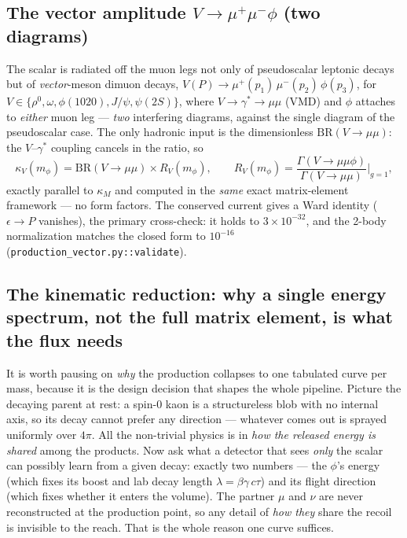 \documentclass[11pt]{article}
\newcommand{\mphi}{m_\phi}
\begin{document}
\subsection{The vector amplitude $V\to\mu^+\mu^-\phi$ (two diagrams)}
\label{sec:vector}

The scalar is radiated off the muon legs not only of pseudoscalar leptonic decays
but of \emph{vector}-meson dimuon decays,
$V(P)\to\mu^+(p_1)\,\mu^-(p_2)\,\phi(p_3)$, for $V\in\{\rho^0,\omega,\phi(1020),
J/\psi,\psi(2S)\}$, where $V\to\gamma^*\to\mu\mu$ (VMD) and $\phi$ attaches to
\emph{either} muon leg --- \emph{two} interfering diagrams, against the single
diagram of the pseudoscalar case. The only hadronic input is the dimensionless
$\mathrm{BR}(V\to\mu\mu)$: the $V$--$\gamma^*$ coupling cancels in the ratio, so
\begin{equation}
\kappa_V(\mphi)=\mathrm{BR}(V\to\mu\mu)\times R_V(\mphi),\qquad
R_V(\mphi)=\frac{\Gamma(V\to\mu\mu\phi)}{\Gamma(V\to\mu\mu)}\bigg|_{g=1},
\label{eq:kappaV}
\end{equation}
exactly parallel to $\kappa_M$ and computed in the \emph{same} exact
matrix-element framework --- no form factors. The conserved current gives a Ward
identity ($\epsilon\to P$ vanishes), the primary cross-check: it holds to
$3\times10^{-32}$, and the 2-body normalization matches the closed form to
$10^{-16}$ (\texttt{production\_vector.py::validate}).

\subsection{The kinematic reduction: why a single energy spectrum, not the full
matrix element, is what the flux needs}
\label{sec:reduction}

It is worth pausing on \emph{why} the production collapses to one tabulated curve
per mass, because it is the design decision that shapes the whole pipeline.
Picture the decaying parent at rest: a spin-0 kaon is a structureless blob with
no internal axis, so its decay cannot prefer any direction --- whatever comes out
is sprayed uniformly over $4\pi$. All the non-trivial physics is in \emph{how the
released energy is shared} among the products. Now ask what a detector that sees
\emph{only} the scalar can possibly learn from a given decay: exactly two numbers
--- the $\phi$'s energy (which fixes its boost and lab decay length
$\lambda=\beta\gamma\,c\tau$) and its flight direction (which fixes whether it
enters the volume). The partner $\mu$ and $\nu$ are never reconstructed at the
production point, so any detail of \emph{how they} share the recoil is invisible
to the reach. That is the whole reason one curve suffices.
\end{document}
